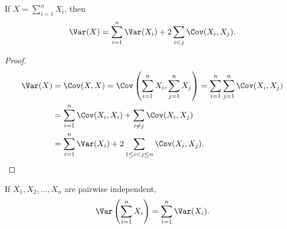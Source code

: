 \begin{corollary}
    If \(X = \sum_{i=1}^n X_i \), then 
    \[
        \Var (X) = \sum_{i=1}^n \Var(X_i) + 2 \sum_{i < j} \Cov(X_i, X_j).  
    \] 
\end{corollary}

\begin{proof}
    \begin{align*}
        \Var(X) &= \Cov(X, X) = \Cov \left( \sum_{i=1}^n X_i, \sum_{j=1}^n X_j   \right) = \sum_{i=1}^n \sum_{j=1}^n \Cov (X_i, X_j) \\
        &= \sum_{i=1}^n \Cov(X_i, X_i) + \sum_{i \neq j} \Cov(X_i, X_j) \\
        &= \sum_{i=1}^n \Var(X_i) + 2 \sum_{1 \le i < j \le n} \Cov(X_i, X_j).       
    \end{align*}
\end{proof}

\begin{corollary}
    If \(X_1, X_2, \dots , X_n\) are pairwise independent, 
    \[
        \Var \left( \sum_{i=1}^n X_i  \right) = \sum_{i=1}^n \Var(X_i).  
    \] 
\end{corollary}

